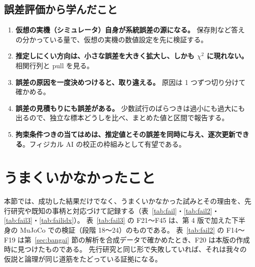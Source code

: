 \documentclass[paper=a4paper,fontsize=10pt,twocolumn,column_gap=2zw,line_length=24zw,number_of_lines=46,head_space=20mm]{jlreq}
\begin{document}
\subsection{誤差評価から学んだこと}
\begin{enumerate}\setlength{\itemsep}{0pt}
\item \textbf{仮想の実機（シミュレータ）自身が系統誤差の源になる。} 保存則など答えの分かっている量で、仮想の実機の数値設定を先に検証する。
\item \textbf{推定しにくい方向は、小さな誤差を大きく拡大し、しかも $\chi^2$ に現れない。} 相関行列と pull を見る。
\item \textbf{誤差の原因を一度決めつけると、取り違える。} 原因は 1 つずつ切り分けて確かめる。
\item \textbf{誤差の見積もりにも誤差がある。} 少数試行のばらつきは過小にも過大にも出るので、独立な標本どうしを比べ、まとめた値と区間で報告する。
\item \textbf{拘束条件つきの当てはめは、推定値とその誤差を同時に与え、逐次更新できる}。フィジカル AI の校正の枠組みとして有望である。
\end{enumerate}


\section{うまくいかなかったこと}\label{sec:fail}

本節では、成功した結果だけでなく、うまくいかなかった試みとその理由を、先行研究や既知の事柄と対応づけて記録する（表~\ref{tab:fail}・\ref{tab:fail2}・\ref{tab:fail3}・\ref{tab:failidx}）。
表~\ref{tab:fail3} の F21〜F45 は、第 4 版で加えた下半身の MuJoCo での検証（段階 18〜24）のものである。
表~\ref{tab:fail2} の F14〜F19 は第~\ref{sec:bangai} 節の解析を合成データで確かめたとき、F20 は本版の作成時に見つけたものである。
先行研究と同じ形で失敗していれば、それは我々の仮説と論理が同じ道筋をたどっている証拠になる。
\end{document}
